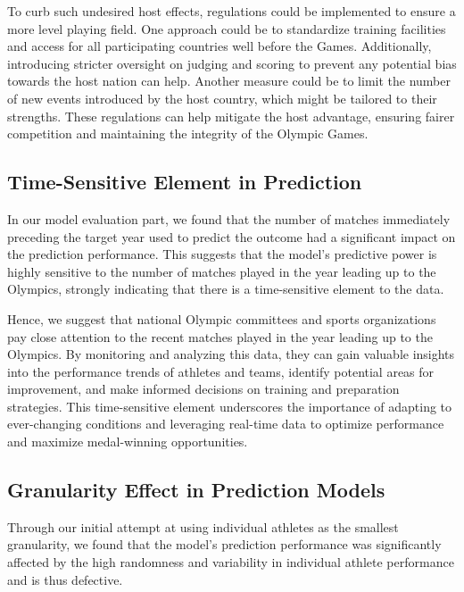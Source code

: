 \documentclass{mcmthesis}
\begin{document}
To curb such undesired host effects, regulations could be implemented to ensure a more level playing field. One approach could be to standardize training facilities and access for all participating countries well before the Games. Additionally, introducing stricter oversight on judging and scoring to prevent any potential bias towards the host nation can help. Another measure could be to limit the number of new events introduced by the host country, which might be tailored to their strengths. These regulations can help mitigate the host advantage, ensuring fairer competition and maintaining the integrity of the Olympic Games.

\subsection{Time-Sensitive Element in Prediction}
In our model evaluation part, we found that the number of matches immediately preceding the target year used to predict the outcome had a significant impact on the prediction performance. This suggests that the model's predictive power is highly sensitive to the number of matches played in the year leading up to the Olympics, strongly indicating that there is a time-sensitive element to the data.

Hence, we suggest that national Olympic committees and sports organizations pay close attention to the recent matches played in the year leading up to the Olympics. By monitoring and analyzing this data, they can gain valuable insights into the performance trends of athletes and teams, identify potential areas for improvement, and make informed decisions on training and preparation strategies. This time-sensitive element underscores the importance of adapting to ever-changing conditions and leveraging real-time data to optimize performance and maximize medal-winning opportunities.



\subsection{Granularity Effect in Prediction Models}
Through our initial attempt at using individual athletes as the smallest granularity, we found that the model's prediction performance was significantly affected by the high randomness and variability in individual athlete performance and is thus defective.
\end{document}
